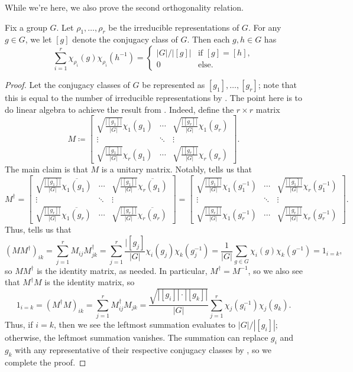 \documentclass{article}
\begin{document}
While we're here, we also prove the second orthogonality relation.
\begin{corollary}
	Fix a group $G$. Let $\rho_1,\ldots,\rho_r$ be the irreducible representations of $G$. For any $g\in G$, we let $[g]$ denote the conjugacy class of $G$. Then each $g,h\in G$ has
	\[\sum_{i=1}^r\chi_{\rho_i}(g)\chi_{\rho_i}\left(h^{-1}\right)=\begin{cases}
		|G|/|[g]| & \text{if }[g]=[h], \\
		0 & \text{else}.
	\end{cases}\]
\end{corollary}
\begin{proof}
	Let the conjugacy classes of $G$ be represented as $[g_1],\ldots,[g_r]$; note that this is equal to the number of irreducible representations by . The point here is to do linear algebra to achieve the result from . Indeed, define the $r\times r$ matrix
	\[M\coloneqq\begin{bmatrix}
		\sqrt{\frac{|[g_1]|}{|G|}}\chi_1(g_1) & \cdots & \sqrt{\frac{|[g_r]|}{|G|}}\chi_1(g_r) \\
		\vdots & \ddots & \vdots \\
		\sqrt{\frac{|[g_1]|}{|G|}}\chi_r(g_1) & \cdots & \sqrt{\frac{|[g_r]|}{|G|}}\chi_r(g_r)
	\end{bmatrix}.\]
	The main claim is that $M$ is a unitary matrix. Notably,  tells us that
	\[M^\dagger=\begin{bmatrix}
		\sqrt{\frac{|[g_1]|}{|G|}}\overline{\chi_1(g_1)} & \cdots & \sqrt{\frac{|[g_1]|}{|G|}}\overline{\chi_r(g_1)} \\
		\vdots & \ddots & \vdots \\
		\sqrt{\frac{|[g_r]|}{|G|}}\overline{\chi_1(g_r)} & \cdots & \sqrt{\frac{|[g_r]|}{|G|}}\overline{\chi_r(g_r)}
	\end{bmatrix}=\begin{bmatrix}
		\sqrt{\frac{|[g_1]|}{|G|}}{\chi_1\left(g_1^{-1}\right)} & \cdots & \sqrt{\frac{|[g_1]|}{|G|}}{\chi_r\left(g_1^{-1}\right)} \\
		\vdots & \ddots & \vdots \\
		\sqrt{\frac{|[g_r]|}{|G|}}{\chi_1\left(g_r^{-1}\right)} & \cdots & \sqrt{\frac{|[g_r]|}{|G|}}{\chi_r\left(g_r^{-1}\right)}
	\end{bmatrix}.\]
	Thus,  tells us that
	\[(MM^\dagger)_{ik}=\sum_{j=1}^rM_{ij}M_{jk}^\dagger=\sum_{j=1}^r\frac{|[g_j]}{|G|}\chi_i(g_j)\chi_k\left(g_j^{-1}\right)=\frac1{|G|}\sum_{g\in G}\chi_i(g)\chi_k(g^{-1})=1_{i=k},\]
	so $MM^\dagger$ is the identity matrix, as needed. In particular, $M^\dagger=M^{-1}$, so we also see that $M^\dagger M$ is the identity matrix, so
	\[1_{i=k}=(M^\dagger M)_{ik}=\sum_{j=1}^rM^\dagger_{ij}M_{jk}=\frac{\sqrt{|[g_i]|\cdot|[g_k]|}}{|G|}\sum_{j=1}^r\chi_j(g_i^{-1})\chi_j(g_k).\]
	Thus, if $i=k$, then we see the leftmost summation evaluates to $|G|/|[g_i]|$; otherwise, the leftmost summation vanishes. The summation can replace $g_i$ and $g_k$ with any representative of their respective conjugacy classes by , so we complete the proof.
\end{proof}
\end{document}
